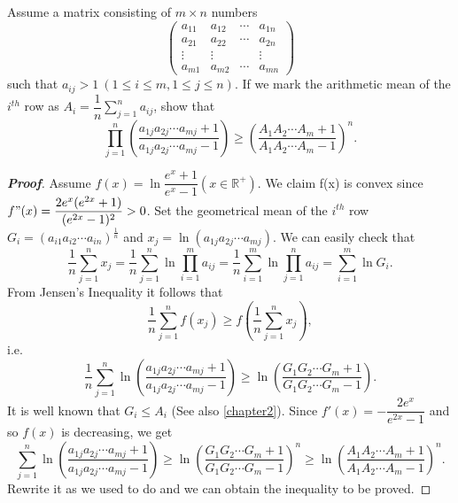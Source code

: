 \documentclass{memoir}
\begin{document}
		
		
\begin{example}
	Assume a matrix consisting of $ m\times n $ numbers 
	\[\left(\begin{array}{cccc}
	a_{11}& a_{12}& \cdots & a_{1n} \\
	a_{21}& a_{22}& \cdots & a_{2n} \\
	\vdots& \vdots & & \vdots \\
	a_{m1}& a_{m2}& \cdots & a_{mn}
	\end{array}\right)\]
	such that $ a_{ij} > 1 \  (1\leqslant i \leqslant m, 1\leqslant j \leqslant n)$. If we mark the arithmetic mean of the $i^{th}$ row as $  A_i=\dfrac{1}{n}\sum\limits_{j=1}^{n}a_{ij} $, show that
	\[ \prod_{j=1}^{n}\left(\dfrac{a_{1j}a_{2j}\cdots a_{mj}+1}{a_{1j}a_{2j}\cdots a_{mj}-1}\right)\geqslant \left(\dfrac{A_{1}A_{2}\cdots A_{m}+1}{A_{1}A_{2}\cdots A_{m}-1}\right)^n.\]
\end{example}

\begin{proof}[\textbf{Proof}]
	Assume $f(x)=\ln\dfrac{e^x+1}{e^x-1}\left(x\in\mathbb{R^+}\right)$. We claim f(x) is convex since $f"(x)=\dfrac{2e^{x}(e^{2x}+1)}{(e^{2x}-1)^2}>0$. Set the geometrical mean of the $i^{th}$ row $ G_i=(a_{i1}a_{i2}\cdots a_{in})^{\frac{1}{n}} $ and $x_j=\ln(a_{1j}a_{2j}\cdots a_{mj}).$ We can easily check that
	\[
	\frac{1}{n}\sum_{j=1}^{n} x_j
	=\frac{1}{n}\sum_{j=1}^{n}\ln\prod_{i=1}^{m}a_{ij}
	=\frac{1}{n}\sum_{i=1}^{m}\ln\prod_{j=1}^{n}a_{ij}
	=\sum_{i=1}^{m}\ln G_i.
	\]
	From Jensen's Inequality it follows that
    \[
    \frac{1}{n}\sum_{j=1}^{n} f\left(x_j\right) \geqslant f\left(\frac{1}{n}\sum_{j=1}^{n} x_j\right),
    \]     
    i.e.
    \[
    \frac{1}{n}\sum_{j=1}^{n}\ln\left(\dfrac{a_{1j}a_{2j}\cdots a_{mj}+1}{a_{1j}a_{2j}\cdots a_{mj}-1}\right)\geqslant \ln\left(\dfrac{G_{1}G_{2}\cdots G_{m}+1}{G_{1}G_{2}\cdots G_{m}-1}\right).
    \]
    It is well known that $G_i\leqslant A_i$ (See also \autoref{chapter2}). Since $f'(x)=-\dfrac{2e^x}{e^{2x}-1}$ and so $ f(x) $ is decreasing, we get
    \[
    \sum_{j=1}^{n}\ln\left(\dfrac{a_{1j}a_{2j}\cdots a_{mj}+1}{a_{1j}a_{2j}\cdots a_{mj}-1}\right)\geqslant \ln\left(\dfrac{G_{1}G_{2}\cdots G_{m}+1}{G_{1}G_{2}\cdots G_{m}-1}\right)^n\geqslant \ln\left(\dfrac{A_{1}A_{2}\cdots A_{m}+1}{A_{1}A_{2}\cdots A_{m}-1}\right)^n. 
    \]
	Rewrite it as we used to do and we can obtain the inequality to be proved. 
\end{proof}	
\par \ \par \ 
 	
\end{document}
